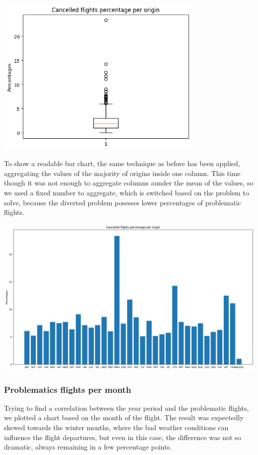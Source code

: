 \documentclass[
	letterpaper, %
	10pt, %
]{class}
\begin{document}
\begin{center}
    \includegraphics[width=10cm]{../images/cancelled_box_per_origin.png}
\end{center}

To show a readable bar chart, the same technique as before has been applied, aggregating the values of the majority of origins inside one column. This time though it was not enough to aggregate columns aunder the mean of the values, so we used a fixed number to aggregate, which is switched based on the problem to solve,
because the diverted problem posesses lower percentages of problematic flights.

\begin{center}
    \includegraphics[width=14cm]{../images/cancelled_per_origin.png}
\end{center}
\newpage

\subsubsection{Problematics flights per month}
Trying to find a correlation between the year period and the problematic flights, we plotted a chart based on the month of the flight. The result was expectedly skewed towards the winter months, where the bad weather conditions can influence the flight departures, but even in this case, the difference was not so dramatic, always remaining in a few percentage points.
\end{document}
